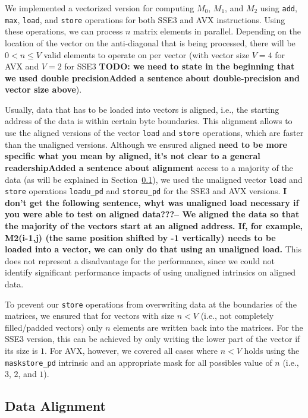 \documentclass[runningheads,a4paper]{llncs}
\begin{document}
We implemented a vectorized version for computing 
$M_0$, $M_1$, and $M_2$ using \texttt{add}, \texttt{max}, \texttt{load}, and \texttt{store}
operations for both SSE3 and AVX instructions.  
Using these operations, we can process $n$ matrix elements in parallel.  
Depending on the location of the vector on the anti-diagonal that is being processed, there will be $0 < n \leq V$ valid elements to operate on 
per vector (with vector size $V = 4$ for AVX and $V = 2$ for SSE3 {\bf TODO: we
need to state in the beginning that we used double precision}{\bf Added a sentence about
double-precision and vector size above}). 

Usually, data that has to be loaded into vectors is aligned, i.e., the starting
address of the data is within certain byte boundaries. This alignment allows to
use the aligned versions of the vector \texttt{load} and \texttt{store} operations,
which are faster than the unaligned versions.
Although we ensured aligned {\bf need to be more specific what you mean by
aligned, it's not clear to a general readership}{\bf Added a sentence about
alignment} 
access to a majority of the data (as will be explained in
Section~\ref{ssec:dataalignment}), we used the unaligned vector \texttt{load} and \texttt{store}
operations \texttt{loadu\_pd} and \texttt{storeu\_pd} for the SSE3 and AVX versions. 
{\bf I don't get the following sentence, whyt was unaligned load necessary if
you were able to test on aligned data???}{\bf -- We aligned the data so that the
  majority of the vectors start at an aligned address. If, for example,
  M2(i-1,j) (the same position shifted by -1 vertically) needs to be loaded into
a vector, we can only do that using an unaligned load.}
  This does not represent a disadvantage for the
performance, since we could not identify significant performance impacts of
using unaligned intrinsics on aligned data.

To prevent our \texttt{store} operations from overwriting data at the boundaries
of the matrices, we ensured that for vectors with size $n < V$ (i.e.,
not completely filled/padded vectors) only $n$ elements are written back into the
matrices.  For the SSE3 version, this can be achieved by only writing the lower
part of the vector if its size is $1$.  For AVX, however, we covered all cases
where $n < V$ holds using the \texttt{maskstore\_pd} intrinsic and an appropriate mask
for all possibles value of $n$ (i.e., $3$, $2$, and $1$).

\subsection{Data Alignment}
\label{ssec:dataalignment}
\end{document}
